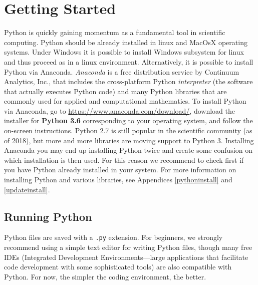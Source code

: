 \label{lab:Python_Intro}

\section*{Getting Started} %

Python is quickly gaining momentum as a fundamental tool in scientific computing.
Python should be already installed in linux and MacOsX operating
systems. Under Windows it is possible to install Windows subsystem for
linux and thus proceed as in a linux environment. Alternatively, it is
possible to install Python via Anaconda.  \emph{Anaconda} is a free
distribution service by Continuum Analytics, Inc., that includes the
cross-platform Python \emph{interpreter} (the software that actually
executes Python code) and many Python libraries that are commonly used
for applied and computational mathematics.  To install Python via
Anaconda, go to \url{https://www.anaconda.com/download/}, download the
installer for \textbf{Python 3.6} corresponding to your operating
system, and follow the on-screen instructions.  Python 2.7 is still
popular in the scientific community (as of 2018), but more and more
libraries are moving support to Python 3.
Installing Anaconda you may end up installing Python twice and create
some confusion on which installation is then used. For this reason we
recommend to check first if you have Python already installed in your system.
For more information on installing Python and various libraries, see Appendices \ref{pythoninstall} and \ref{updateinstall}.

\subsection*{Running Python} %

Python files are saved with a \texttt{.py} extension.
For beginners, we strongly recommend using a simple text editor for writing Python files, though many free IDEs (Integrated Development Environments---large applications that facilitate code development with some sophisticated tools) are also compatible with Python.
For now, the simpler the coding environment, the better.

